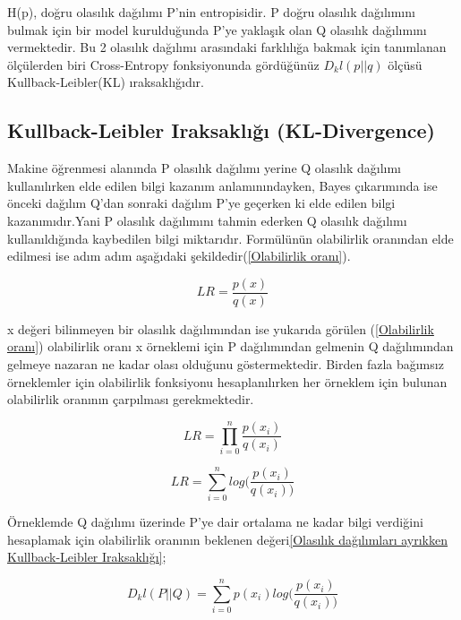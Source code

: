 \documentclass[12pt, a4paper]{article}
\begin{document}
			H(p), doğru olasılık dağılımı P’nin entropisidir. P doğru olasılık dağılımını bulmak için bir model kurulduğunda P’ye yaklaşık olan Q olasılık dağılımını vermektedir. Bu 2 olasılık dağılımı arasındaki farklılığa bakmak için tanımlanan ölçülerden  biri Cross-Entropy fonksiyonunda gördüğünüz $D_kl(p||q)$ ölçüsü Kullback-Leibler(KL) ıraksaklığıdır.
			
			\subsection{Kullback-Leibler Iraksaklığı \newline (KL-Divergence)}
			Makine öğrenmesi alanında P olasılık dağılımı yerine Q olasılık dağılımı kullanılırken elde edilen bilgi kazanım anlamınındayken, Bayes çıkarımında ise önceki dağılım Q’dan sonraki dağılım P’ye geçerken ki elde edilen bilgi kazanımıdır.Yani P olasılık dağılımını tahmin ederken Q olasılık dağılımı kullanıldığında kaybedilen  bilgi miktarıdır. Formülünün olabilirlik oranından elde edilmesi ise adım adım aşağıdaki şekildedir(\ref{Olabilirlik oranı}).
			\newline
			\begin {center}
				\begin{equation}LR=\frac{p(x)}{q(x)}	\label{eqn:Olabilirlik oranı}	\end{equation}
		
			\end {center}
		
			
			x değeri bilinmeyen bir olasılık dağılımından ise yukarıda görülen (\ref{Olabilirlik oranı}) olabilirlik oranı x örneklemi için P dağılımından gelmenin Q dağılımından gelmeye nazaran ne kadar olası olduğunu göstermektedir. Birden fazla bağımsız örneklemler için olabilirlik fonksiyonu hesaplanılırken her örneklem için bulunan olabilirlik oranının çarpılması gerekmektedir. 
			\begin {center}
			\begin{equation}LR=\prod_{i=0}^{n}\frac{p(x_i)}{q(x_i)}		\end{equation}
				\end {center}
				\begin {center}
			\begin{equation}LR = \sum_{i=0}^{n} log(\frac{p(x_i)}{q(x_i))}	\end{equation}
			\end {center}
			Örneklemde Q dağılımı üzerinde P’ye dair ortalama ne kadar bilgi verdiğini hesaplamak için olabilirlik oranının beklenen değeri\ref{Olasılık dağılımları ayrıkken Kullback-Leibler Iraksaklığı};
				\begin {center}
			\begin{equation}D_kl(P||Q) =  \sum_{i=0}^{n} p(x_i)log(\frac{p(x_i)}{q(x_i))}	\label{eqn:Olasılık dağılımları ayrıkken Kullback-Leibler Iraksaklığı}	\end{equation}
			\end {center}
			
\end{document}
